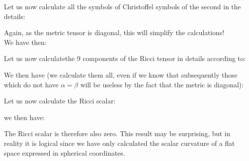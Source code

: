 	\begin{tcolorbox}[colframe=black,colback=white,sharp corners]
	
	Let us now calculate all the symbols of Christoffel symbols of the second in the details:
	
	Again, as the metric tensor is diagonal, this will simplify the calculations!\\

	We have then:
	
	\end{tcolorbox}
	\begin{tcolorbox}[colframe=black,colback=white,sharp corners]
	Let us now calculatethe $9$ components of the Ricci tensor in details according to:
	
	We then have (we calculate them all, even if we know that subsequently those which do not have $\alpha=\beta$ will be useless by the fact that the metric is diagonal):
	
	\end{tcolorbox}
	
	\begin{tcolorbox}[colframe=black,colback=white,sharp corners]
	
	\end{tcolorbox}
	
	\begin{tcolorbox}[colframe=black,colback=white,sharp corners]
	
	\end{tcolorbox}
	
	\begin{tcolorbox}[colframe=black,colback=white,sharp corners]
	
	\end{tcolorbox}
	
	\begin{tcolorbox}[colframe=black,colback=white,sharp corners]
	
	Let us now calculate the Ricci scalar:
	
	we then have:
	
	The Ricci scalar is therefore also zero. This result may be surprising, but in reality it is logical since we have only calculated the scalar curvature of a flat space expressed in spherical coordinates.
	\end{tcolorbox}
	
